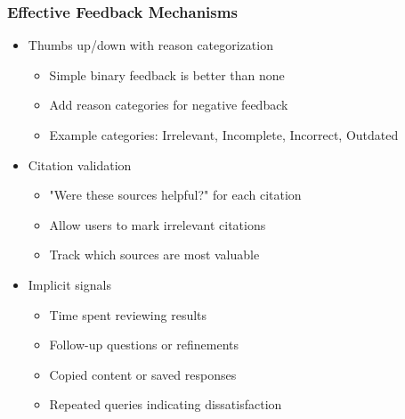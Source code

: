 {    \begin{frame}
        \frametitle{Effective Feedback Mechanisms}
        \begin{itemize}
            \item Thumbs up/down with reason categorization
            \begin{itemize}
                \item Simple binary feedback is better than none
                \item Add reason categories for negative feedback
                \item Example categories: Irrelevant, Incomplete, Incorrect, Outdated
            \end{itemize}
            \item Citation validation
            \begin{itemize}
                \item "Were these sources helpful?" for each citation
                \item Allow users to mark irrelevant citations
                \item Track which sources are most valuable
            \end{itemize}
            \item Implicit signals
            \begin{itemize}
                \item Time spent reviewing results
                \item Follow-up questions or refinements
                \item Copied content or saved responses
                \item Repeated queries indicating dissatisfaction
            \end{itemize}
        \end{itemize}
    \end{frame}

}
